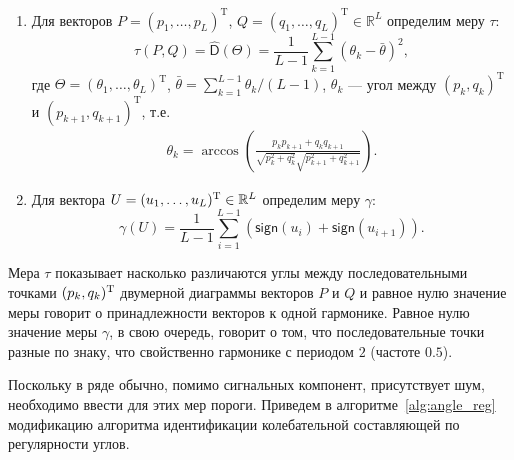 \documentclass[specialist,
substylefile = spbu_report.rtx,
subf,12pt]{disser}
\theoremstyle{definition}
\newcommand{\R}{\mathbb{R}}
\begin{document}
\begin{enumerate}
	\item Для векторов $P = (p_1,\ldots,p_L)^{\mathrm{T}}$, $Q=(q_1,\ldots,q_L)^{\mathrm{T}}\in\R^L$ определим меру $\tau$:
	      \begin{equation}\label{eq:tau_measure}
		      \tau(P, Q) = \hat{\mathsf{D}}(\Theta) =\frac{1}{L-1}\sum_{k=1}^{L-1}{\left(\theta_k  - \bar{\theta}\right)^2},
	      \end{equation}
	      где $\Theta=(\theta_1,\ldots,\theta_L)^{\mathrm{T}}$,
	      $\bar{\theta} = \sum_{k=1}^{L-1}{\theta_k}/(L-1)$, $\theta_k$ --- угол между
	      $\left(p_k, q_{k}\right)^{\mathrm{T}}$ и $\left(p_{k+1}, q_{k+1}\right)^{\mathrm{T}}$, т.е.
	      \begin{gather*}
		      \theta_k = \arccos{\left(\frac{p_{k} p_{k+1} + q_{k} q_{k+1}}{\sqrt{p_{k}^2+q_{k}^2}\sqrt{p_{k+1}^2+q_{k+1}^2}}\right)}.
	      \end{gather*}
	\item Для вектора $U = (u_1,\ldots,u_L)^\rmT\in\R^L$ определим меру $\gamma$:
	      \begin{equation}\label{eq:gamma_measure}
		      \gamma(U) = \frac{1}{L - 1}\sum_{i = 1}^{L - 1}(\mathsf{sign}(u_i) + \mathsf{sign}(u_{i + 1})).
	      \end{equation}
\end{enumerate}

Мера $\tau$ показывает насколько различаются углы между последовательными точками $(p_k, q_k)^{\mathrm{T}}$ двумерной диаграммы векторов $P$ и $Q$ и равное нулю значение меры говорит о принадлежности векторов к одной гармонике. Равное нулю значение меры $\gamma$, в свою очередь, говорит о том, что последовательные точки разные по знаку, что свойственно гармонике с периодом $2$ (частоте $0.5$).

Поскольку в ряде обычно, помимо сигнальных компонент, присутствует шум, необходимо ввести для этих мер пороги. Приведем в алгоритме~\ref{alg:angle_reg} модификацию алгоритма идентификации колебательной составляющей по регулярности углов.
\end{document}
